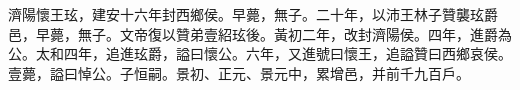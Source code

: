
\begin{pinyinscope}
濟陽懷王玹，建安十六年封西鄉侯。早薨，無子。二十年，以沛王林子贊襲玹爵邑，早薨，無子。文帝復以贊弟壹紹玹後。黃初二年，改封濟陽侯。四年，進爵為公。太和四年，追進玹爵，謚曰懷公。六年，又進號曰懷王，追謚贊曰西鄉哀侯。壹薨，謚曰悼公。子恒嗣。景初、正元、景元中，累增邑，并前千九百戶。


\end{pinyinscope}